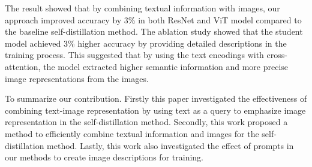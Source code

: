 The result showed that by combining textual information with images, our approach improved accuracy by 3\% in both ResNet  and ViT  model compared to the baseline self-distillation method.
The ablation study showed that the student model achieved 3\% higher accuracy by providing detailed descriptions in the training process.
This suggested that by using the text encodings with cross-attention, the model extracted higher semantic information and more precise image representations from the images.

To summarize our contribution.
Firstly this paper investigated the effectiveness of combining text-image representation by using text as a query to emphasize image representation in the self-distillation method.
Secondly, this work proposed a method to efficiently combine textual information and images for the self-distillation method.
Lastly, this work also investigated the effect of prompts in our methods to create image descriptions for training.




